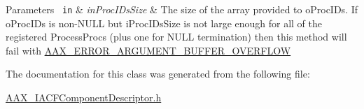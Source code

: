 \begin{DoxyParams}[1]{Parameters}
\mbox{\texttt{ in}}  & {\em in\+Proc\+I\+Ds\+Size} & The size of the array provided to {\ttfamily o\+Proc\+I\+Ds}. If {\ttfamily o\+Proc\+I\+Ds} is non-\/\+N\+U\+LL but {\ttfamily i\+Proc\+I\+Ds\+Size} is not large enough for all of the registered Process\+Procs (plus one for N\+U\+LL termination) then this method will fail with \mbox{\hyperlink{a00494_a5f8c7439f3a706c4f8315a9609811937af9fc41c647e2c9959ed6ebb45191be52}{A\+A\+X\+\_\+\+E\+R\+R\+O\+R\+\_\+\+A\+R\+G\+U\+M\+E\+N\+T\+\_\+\+B\+U\+F\+F\+E\+R\+\_\+\+O\+V\+E\+R\+F\+L\+OW}} \\
\hline
\end{DoxyParams}


The documentation for this class was generated from the following file\+:\begin{DoxyCompactItemize}
\item 
\mbox{\hyperlink{a00512}{A\+A\+X\+\_\+\+I\+A\+C\+F\+Component\+Descriptor.\+h}}\end{DoxyCompactItemize}
